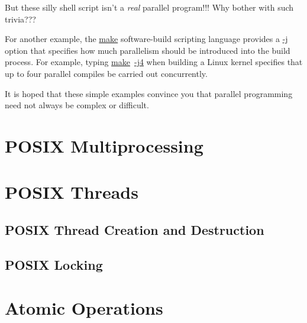 \QuickQuiz{}
	But these silly shell script isn't a \emph{real} parallel
	program!!!
	Why bother with such trivia???
 \QuickQuizEnd

For another example, the \url{make} software-build scripting language 
provides a \url{-j} option that specifies how much parallelism should be
introduced into the build process.
For example, typing \url{make}~\url{-j4} when building a Linux kernel
specifies that up to four parallel compiles be carried out concurrently.

It is hoped that these simple examples convince you that parallel
programming need not always be complex or difficult.

\section{POSIX Multiprocessing}
\label{sec:toolsoftrade:POSIX Multiprocessing}

\section{POSIX Threads}
\label{sec:toolsoftrade:POSIX Threads}

\subsection{POSIX Thread Creation and Destruction}
\label{sec:toolsoftrade:POSIX Thread Creation and Destruction}

\subsection{POSIX Locking}
\label{sec:toolsoftrade:POSIX Locking}

\section{Atomic Operations}
\label{sec:toolsoftrade:Atomic Operations}
